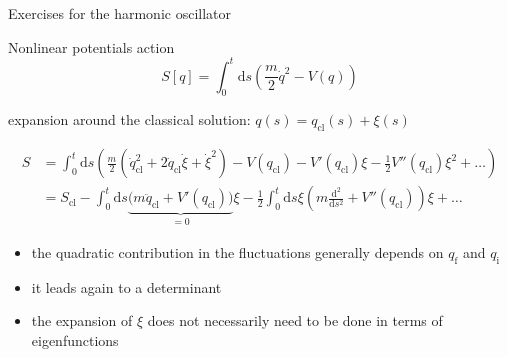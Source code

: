 \documentclass[t,dvipsnames]{beamer}
\begin{document}
\begin{frame}[t]{Exercises for the harmonic oscillator}
 \begin{center}

 \vspace{0.3truecm}
 \end{center}
\end{frame}

\begin{frame}[c]{Nonlinear potentials}
 action
 \begin{displaymath}
  S[q] = \int_0^t\text{d}s\left(\frac{m}{2}\dot q^2 - V(q)\right)
 \end{displaymath}

 \vspace{0.2truecm}
 expansion around the classical solution: $q(s) = q_\text{cl}(s)+\xi(s)$

 \begin{footnotesize}
  \begin{displaymath}
   \begin{aligned}
    S &= \int_0^t\text{d}s\left(\frac{m}{2}(\dot q_\text{cl}^2+2\dot q_\text{cl}\dot\xi+\dot\xi^2)
         -V(q_\text{cl})-V'(q_\text{cl})\xi-\frac{1}{2}V''(q_\text{cl})\xi^2+\ldots\right)\\
      &= S_\text{cl} - \int_0^t\text{d}s\underbrace{\big(m\ddot q_\text{cl}+V'(q_\text{cl})\big)}_{=0}\xi
         -\frac{1}{2}\int_0^t\text{d}s \xi\left(m\frac{\text{d}^2}{\text{d}s^2}+V''(q_\text{cl})\right)\xi
	 + \ldots
   \end{aligned}
  \end{displaymath}
 \end{footnotesize}

 \begin{itemize}
  \item the quadratic contribution in the fluctuations generally depends on $q_\text{f}$ and $q_\text{i}$
  \item it leads again to a determinant
  \item the expansion of $\xi$ does not necessarily need to be done in terms of eigenfunctions 
 \end{itemize}
\end{frame}
\end{document}
